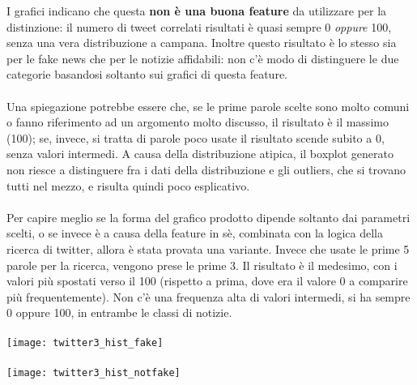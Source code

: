 \documentclass{article}
\begin{document}
\begin{multicols}{2}
				I grafici indicano che questa \textbf{non è una buona feature} da utilizzare per la distinzione: il numero di tweet correlati risultati è quasi sempre 0 \textit{oppure} 100, senza una vera distribuzione a campana. Inoltre questo risultato è lo stesso sia per le fake news che per le notizie affidabili: non c'è modo di distinguere le due categorie basandosi soltanto sui grafici di questa feature.
				\\~\\
				Una spiegazione potrebbe essere che, se le prime parole scelte sono molto comuni o fanno riferimento ad un argomento molto discusso, il risultato è il massimo (100); se, invece, si tratta di parole poco usate il risultato scende subito a 0, senza valori intermedi.
				A causa della distribuzione atipica, il boxplot generato non riesce a distinguere fra i dati della distribuzione e gli outliers, che si trovano tutti nel mezzo, e risulta quindi poco esplicativo.
				\\~\\
				Per capire meglio se la forma del grafico prodotto dipende soltanto dai parametri scelti, o se invece è a causa della feature in sè, combinata con la logica della ricerca di twitter, allora è stata provata una variante. Invece che usate le prime 5 parole per la ricerca, vengono prese le prime 3. Il risultato è il medesimo, con i valori più spostati verso il 100 (rispetto a prima, dove era il valore 0 a comparire più frequentemente). Non c'è una frequenza alta di valori intermedi, si ha sempre 0 oppure 100, in entrambe le classi di notizie.
				\\~\\
				\texttt{[image: twitter3\_hist\_fake]}
				\\~\\
				\texttt{[image: twitter3\_hist\_notfake]}
				\\~\\
				

\end{multicols}
\end{document}
